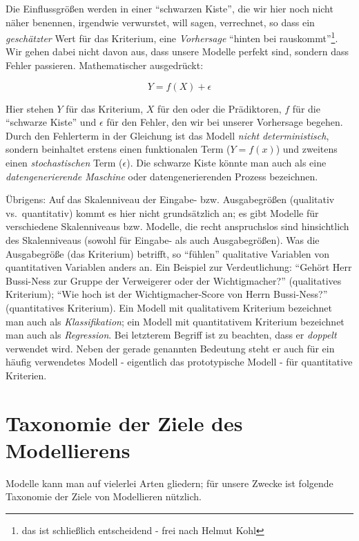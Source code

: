 \documentclass[12pt,ngerman,]{book}
\let\rmarkdownfootnote\footnote%
\def\footnote{\protect\rmarkdownfootnote}
\theoremstyle{definition}
\theoremstyle{definition}
\theoremstyle{remark}
\begin{document}
Die Einflussgrößen werden in einer ``schwarzen Kiste'', die wir hier
noch nicht näher benennen, irgendwie verwurstet, will sagen, verrechnet,
so dass ein \emph{geschätzter} Wert für das Kriterium, eine
\emph{Vorhersage} ``hinten bei rauskommt''\footnote{das ist schließlich
  entscheidend - frei nach Helmut Kohl}. Wir gehen dabei nicht davon
aus, dass unsere Modelle perfekt sind, sondern dass Fehler passieren.
Mathematischer ausgedrückt:

\[Y = f(X) + \epsilon\]

Hier stehen \(Y\) für das Kriterium, \(X\) für den oder die Prädiktoren,
\(f\) für die ``schwarze Kiste'' und \(\epsilon\) für den Fehler, den
wir bei unserer Vorhersage begehen. Durch den Fehlerterm in der
Gleichung ist das Modell \emph{nicht}
\emph{deterministisch}, sondern beinhaltet
erstens einen funktionalen Term (\(Y=f(x)\)) und zweitens einen
\emph{stochastischen} Term (\(\epsilon\)). Die schwarze Kiste könnte man
auch als eine \emph{datengenerierende
Maschine} oder datengenerierenden
Prozess bezeichnen.

Übrigens: Auf das Skalenniveau der Eingabe- bzw. Ausgabegrößen
(qualitativ vs.~quantitativ) kommt es hier nicht grundsätzlich an; es
gibt Modelle für verschiedene Skalenniveaus bzw. Modelle, die recht
anspruchslos sind hinsichtlich des Skalenniveaus (sowohl für Eingabe-
als auch Ausgabegrößen). Was die Ausgabegröße (das Kriterium) betrifft,
so ``fühlen'' qualitative Variablen von quantitativen Variablen anders
an. Ein Beispiel zur Verdeutlichung: ``Gehört Herr Bussi-Ness zur Gruppe
der Verweigerer oder der Wichtigmacher?'' (qualitatives Kriterium);
``Wie hoch ist der Wichtigmacher-Score von Herrn Bussi-Ness?''
(quantitatives Kriterium). Ein Modell mit qualitativem Kriterium
bezeichnet man auch als \emph{Klassifikation}; ein
Modell mit quantitativem Kriterium bezeichnet man auch als
\emph{Regression}. Bei letzterem Begriff ist zu
beachten, dass er \emph{doppelt} verwendet wird. Neben der gerade
genannten Bedeutung steht er auch für ein häufig verwendetes Modell -
eigentlich das prototypische Modell - für quantitative Kriterien.

\section{Taxonomie der Ziele des Modellierens}\label{Ziele}

Modelle kann man auf vielerlei Arten gliedern; für unsere Zwecke ist
folgende Taxonomie der Ziele von Modellieren nützlich.
\end{document}
